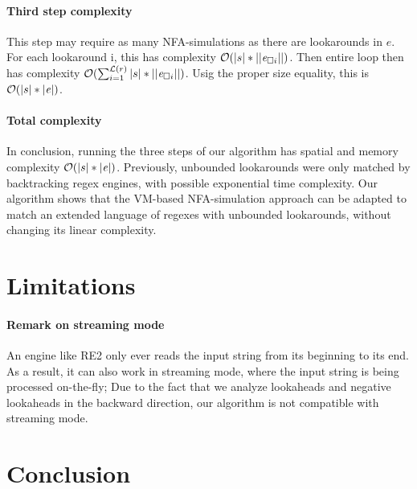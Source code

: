 \documentclass{article}
\def\size#1{\ensuremath{|#1|}}
\def\psize#1{\ensuremath{||#1||}}
\def\looknb#1{\ensuremath{\mathcal{L}(#1)}}
\def\bigo{\ensuremath{\mathcal{O}}}
\begin{document}
\paragraph{Third step complexity}
This step may require as many NFA-simulations as there are lookarounds in $e$.
For each lookaround i, this has complexity $\bigo(\size{s} * \psize{\re_{\Box i}})$.
Then entire loop then has complexity $\bigo(\sum_{i=1}^{\looknb{r}} \size{s} * \psize{\re_{\Box i}})$.
Usig the proper size equality, this is $\bigo(\size{s} * \size{\re})$.

\paragraph{Total complexity}
In conclusion, running the three steps of our algorithm has spatial and memory complexity $\bigo(\size{s} * \size{\re})$.
Previously, unbounded lookarounds were only matched by backtracking regex engines, with possible exponential time complexity.
Our algorithm shows that the VM-based NFA-simulation approach can be adapted to match an extended language of regexes with unbounded lookarounds, without changing its linear complexity.

\section{Limitations}

\paragraph{Remark on streaming mode}
An engine like RE2 only ever reads the input string from its beginning to its end.
As a result, it can also work in streaming mode, where the input string is being processed on-the-fly;
Due to the fact that we analyze lookaheads and negative lookaheads in the backward direction, our algorithm is not compatible with streaming mode.

\section{Conclusion}



\newpage

\end{document}
